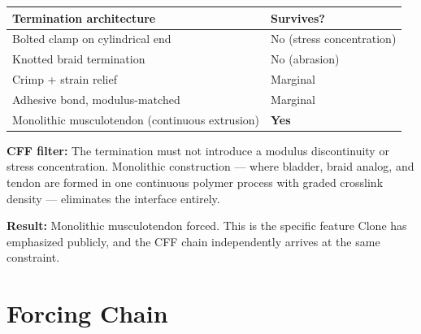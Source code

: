 \documentclass[11pt, a4paper]{article}
\begin{document}
\begin{center}
\begin{tabular}{@{}ll@{}}
\toprule
\textbf{Termination architecture} & \textbf{Survives?} \\
\midrule
Bolted clamp on cylindrical end & \textcolor{nm-red}{No (stress concentration)} \\
Knotted braid termination & \textcolor{nm-red}{No (abrasion)} \\
Crimp + strain relief & \textcolor{nm-orange}{Marginal} \\
Adhesive bond, modulus-matched & \textcolor{nm-orange}{Marginal} \\
Monolithic musculotendon (continuous extrusion) &
  \textcolor{nm-green}{\textbf{Yes}} \\
\bottomrule
\end{tabular}
\end{center}

\textbf{CFF filter:} The termination must not introduce a
modulus discontinuity or stress concentration. Monolithic
construction --- where bladder, braid analog, and tendon are
formed in one continuous polymer process with graded crosslink
density --- eliminates the interface entirely.

\textbf{Result:} Monolithic musculotendon forced. This is the
specific feature Clone has emphasized publicly, and the CFF
chain independently arrives at the same constraint.

\section{Forcing Chain}
\end{document}
